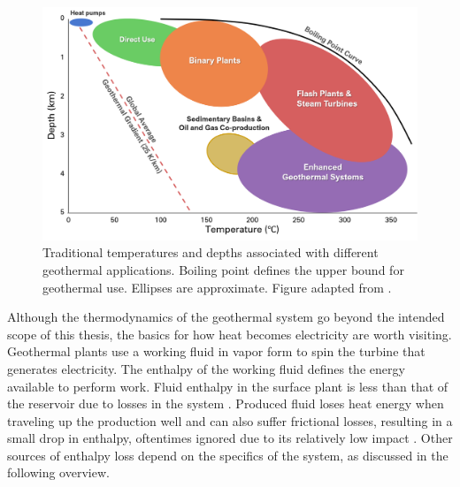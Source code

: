 \begin{figure}
\centering
\includegraphics[width=\textwidth]{templates/images/Figure-Geothermal_Use_Moore2013.png}
\caption[Geothermal applications by temperature and depth]{Traditional temperatures and depths associated with different geothermal applications. Boiling point defines the upper bound for geothermal use. Ellipses are approximate. Figure adapted from \protect\citep{moore_more_2013}.}
\label{fig:geotherm_apps}
\end{figure}

Although the thermodynamics of the geothermal system go beyond the intended scope of this thesis, the basics for how heat becomes electricity are worth visiting. Geothermal plants use a working fluid in vapor form to spin the turbine that generates electricity. The enthalpy of the working fluid defines the energy available to perform work. Fluid enthalpy in the surface plant is less than that of the reservoir due to losses in the system \citep[p.\ 204]{glassley_geothermal_2015}. Produced fluid loses heat energy when traveling up the production well and can also suffer frictional losses, resulting in a small drop in enthalpy, oftentimes ignored due to its relatively low impact \citep[p.\ 204]{glassley_geothermal_2015}. Other sources of enthalpy loss depend on the specifics of the system, as discussed in the following overview.

